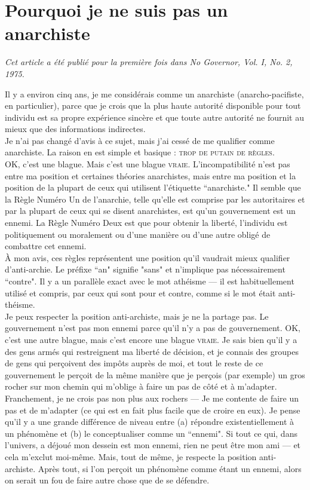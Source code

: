 \chapter{Pourquoi je ne suis pas un anarchiste}

\emph{Cet article a été publié pour la première fois dans No Governor, Vol. I, No. 2, 1975.\\}

Il y a environ cinq ans, je me considérais comme un anarchiste (anarcho-pacifiste, en particulier), parce que je crois que la plus haute autorité disponible pour tout individu est sa propre expérience sincère et que toute autre autorité ne fournit au mieux que des informations indirectes.\\
Je n'ai pas changé d'avis à ce sujet, mais j'ai cessé de me qualifier comme anarchiste. La raison en est simple et basique : \textsc{trop de putain de règles}.\\
OK, c'est une blague. Mais c'est une blague \textsc{vraie}. L'incompatibilité n'est pas entre ma position et certaines théories anarchistes, mais entre ma position et la position de la plupart de ceux qui utilisent l'étiquette ``anarchiste."
Il semble que la Règle Numéro Un de l'anarchie, telle qu'elle est comprise par les autoritaires et par la plupart de ceux qui se disent anarchistes, est qu'un gouvernement est un ennemi. La Règle Numéro Deux est que pour obtenir la liberté, l'individu est politiquement ou moralement ou d'une manière ou d'une autre obligé de combattre cet ennemi.\\
À mon avis, ces règles représentent une position qu'il vaudrait mieux qualifier d'anti-archie. Le préfixe ``an" signifie "sans" et n'implique pas nécessairement ``contre". Il y a un parallèle exact avec le mot athéisme --- il est habituellement utilisé et compris, par ceux qui sont pour et contre, comme si le mot était anti-théisme.\\
Je peux respecter la position anti-archiste, mais je ne la partage pas. Le gouvernement n'est pas mon ennemi parce qu'il n'y a pas de gouvernement. OK, c'est une autre blague, mais c'est encore une blague \textsc{vraie}. Je sais bien qu'il y a des gens armés qui restreignent ma liberté de décision, et je connais des groupes de gens qui perçoivent des impôts auprès de moi, et tout le reste de ce gouvernement le perçoit de la même manière que je perçois (par exemple) un gros rocher sur mon chemin qui m'oblige à faire un pas de côté et à m'adapter. Franchement, je ne crois pas non plus aux rochers --- Je me contente de faire un pas et de m'adapter (ce qui est en fait plus facile que de croire en eux). Je pense qu'il y a une grande différence de niveau entre (a) répondre existentiellement à un phénomène et (b) le conceptualiser comme un ``ennemi". Si tout ce qui, dans l'univers, a déjoué mon dessein est mon ennemi, rien ne peut être mon ami --- et cela m'exclut moi-même. Mais, tout de même, je respecte la position anti-archiste. Après tout, si l'on perçoit un phénomène comme étant un ennemi, alors on serait un fou de faire autre chose que de se défendre.\\
